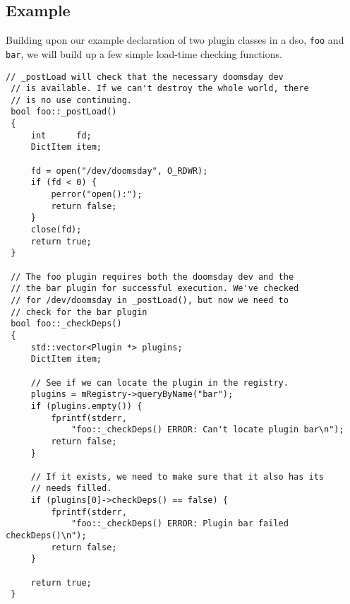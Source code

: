 \subsection{Example}

Building upon our example declaration of two plugin classes in a dso,
{\tt foo} and {\tt bar}, we will build up a few simple load-time checking 
functions.

\begin{lstlisting}[frame=single]
 // _postLoad will check that the necessary doomsday dev
 // is available. If we can't destroy the whole world, there
 // is no use continuing.
 bool foo::_postLoad() 
 {
     int      fd;
     DictItem item;

     fd = open("/dev/doomsday", O_RDWR);
     if (fd < 0) {
         perror("open():");
         return false;
     }
     close(fd);
     return true;
 }

 // The foo plugin requires both the doomsday dev and the
 // the bar plugin for successful execution. We've checked
 // for /dev/doomsday in _postLoad(), but now we need to 
 // check for the bar plugin
 bool foo::_checkDeps() 
 { 
     std::vector<Plugin *> plugins;
     DictItem item;

     // See if we can locate the plugin in the registry.
     plugins = mRegistry->queryByName("bar");   
     if (plugins.empty()) {
         fprintf(stderr, 
             "foo::_checkDeps() ERROR: Can't locate plugin bar\n");
         return false;
     }

     // If it exists, we need to make sure that it also has its
     // needs filled.
     if (plugins[0]->checkDeps() == false) {
         fprintf(stderr, 
             "foo::_checkDeps() ERROR: Plugin bar failed checkDeps()\n");
         return false;
     }

     return true;
 }
\end{lstlisting}

